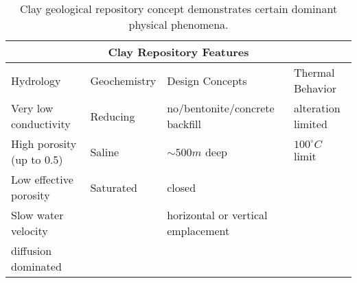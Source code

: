 %
\begin{table}[h!]
  \centering
  \footnotesize{
  \begin{tabular}{|l|l|l|l|}
    \multicolumn{4}{c}{\textbf{Clay Repository Features}}\\
    \hline
     Hydrology & Geochemistry & Design Concepts & Thermal Behavior \\ 
    \hline
    Very low conductivity&Reducing&no/bentonite/concrete backfill &alteration limited\\
    High porosity (up to 0.5)&Saline&$\sim500m$ deep&$100^\circ C$ limit \\
    Low effective porosity&Saturated&closed&\\
    Slow water velocity &&horizontal or vertical emplacement&\\
    diffusion dominated &&&\\
    \hline
  \end{tabular}
  \caption[Clay Repository Features]{Clay geological repository 
  concept demonstrates certain dominant physical phenomena. }
  \label{tab:clay_tab}
  }
\end{table}


